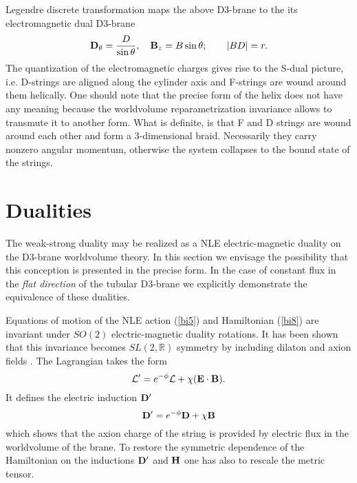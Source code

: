 \documentclass[a4paper,12pt]{article}
\begin{document}
\noindent

Legendre discrete transformation maps the above D3-brane to the its 
electromagnetic dual D3-brane
\begin{equation}
{\bf D}_{\theta}=\frac{D}{\sin\theta},\quad {\bf B}_z=B\sin\theta ;\qquad |BD|=r.
\label{p13}
\end{equation}
The quantization of the electromagnetic charges gives rise to the S-dual 
picture, i.e. D-strings are aligned along the cylinder axis and F-strings 
are wound around them helically.
One should note that the precise form of the helix does not have 
any meaning because the worldvolume reparametrization invariance allows to
transmute it to another form. What is definite, is that F and D strings are
wound around each other and form a 3-dimensional braid. Necessarily they 
carry nonzero angular momentum, otherwise the system collapses to the bound 
state of the strings.

\section{Dualities}

\noindent

The weak-strong duality may be realized as a NLE electric-magnetic duality 
on the D3-brane worldvolume theory. In this section we envisage the 
possibility that this conception is presented in the precise form. In the 
case of constant flux in the {\it flat direction} of the tubular D3-brane 
we explicitly demonstrate the equivalence of these dualities.

\noindent

Equations of motion of the NLE action (\ref{bi5}) and Hamiltonian (\ref{bi8}) 
are invariant under $SO(2)$ electric-magnetic duality rotations. It has been 
shown that this invariance becomes $SL(2,\mathbb{R})$ symmetry by including 
dilaton and axion fields \cite{2,3,4}. The Lagrangian takes the form 
\cite{3,5,6} 
\begin{equation}
{\cal L}^{\prime}=e^{-\phi}{\cal L}+\chi({\bf E}\cdot{\bf B}).
\label{d1}
\end{equation}
It defines the electric induction ${{\bf D}}^{\prime}$
\begin{equation}
{{\bf D}}^{\prime}=e^{-\phi}{\bf D}+\chi{\bf B}
\label{d2}
\end{equation}
which shows that the axion charge of the string is provided by electric flux
in the worldvolume of the brane. To restore the symmetric dependence of the 
Hamiltonian on the inductions ${{\bf D}}^{\prime}$ and ${\bf H}$ one has also to 
rescale the metric tensor.
\end{document}

